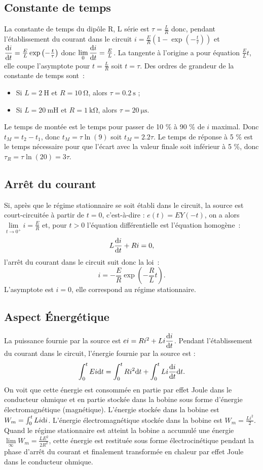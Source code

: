 \subsection{Constante de temps}
La constante de temps du dipôle R, L série est $\tau=\frac{L}{R}$ donc, pendant l'établissement du courant dans le circuit $i = \frac{E}{R} \left(1 - \exp\left(-\frac{t}{\tau}\right)\right)$ et $\dfrac{\mathrm{d} i}{\mathrm{d} t}=\frac{E}{L}\exp\left(-\frac{t}{\tau}\right)$ donc $ \lim\limits_{0} \dfrac{\mathrm{d} i}{\mathrm{d} t} = \frac{E}{L}$. La tangente à l'origine a pour équation $\frac{E}{L} t$, elle coupe l'asymptote pour $t = \frac{L}{R}$ soit $t = \tau$. Des ordres de grandeur de la constante de temps sont~:
\begin{itemize}
\item Si $L=\SI{2}{\henry}$ et $R=\SI{10}{\ohm}$, alors $\tau=\SI{0.2}{\second}$ ;
\item Si $L=\SI{20}{\milli\henry}$ et $R=\SI{1}{\kilo\ohm}$, alors $\tau=\SI{20}{\micro\second}$.
\end{itemize}
Le temps de montée est le temps pour passer de 10 \% à 90 \% de $i$ maximal. 	Donc $t_M = t_2 - t_1$, donc $t_M = \tau \ln(9)$ soit $t_M = 2.2\tau$.
Le temps de réponse à 5 \% est le temps nécessaire pour que l'écart avec la valeur finale soit inférieur à 5 \%, donc $\tau_R = \tau \ln(20) = 3\tau$.
\subsection{Arrêt du courant}
Si, après que le régime stationnaire se soit établi dans le circuit, la source est court-circuitée à partir de $t = 0$, c'est-à-dire : $e(t) = E Y(-t)$, on a alors $\lim\limits_{t \to 0^+} i = \frac{E}{R}$ et, pour $t > 0$ l'équation différentielle est l'équation homogène~:
\begin{equation}
L \dfrac{\mathrm{d} i}{\mathrm{d} t} + Ri = 0, 
\end{equation}
l'arrêt du courant dans le circuit suit donc la loi~:
\begin{equation}
i = -\frac{E}{R} \exp\left(-\frac{R}{L} t\right).
\end{equation} 
L'asymptote est $i = 0$, elle correspond au régime stationnaire.
\subsection{Aspect Énergétique}
La puissance fournie par la source est $ei = Ri^2+Li \dfrac{\mathrm{d} i}{\mathrm{d} t}$.
Pendant l'établissement du courant dans le circuit, l'énergie fournie par la source est :
\begin{equation}
\int_0^t Ei \mathrm{d} t = \int_0^t Ri^2 \mathrm{d} t+ \int_0^t Li \dfrac{\mathrm{d} i}{\mathrm{d} t} \mathrm{d} t.
\end{equation}
On voit que cette énergie est consommée en partie par effet Joule dans le conducteur ohmique et en partie stockée dans la bobine sous forme d'énergie électromagnétique (magnétique). L'énergie stockée dans la bobine est $W_m = \int_0^t Li \mathrm{d} i$. L'énergie électromagnétique stockée dans la bobine est $W_m = \frac{Li^2}{2}$. Quand le régime stationnaire est atteint la bobine a accumulé une énergie $\lim\limits_{\infty} W_m = \frac{LE^2}{2R^2}$, cette énergie est restituée sous forme électrocinétique pendant la phase d'arrêt du courant et finalement transformée en chaleur par effet Joule dans le conducteur ohmique.
